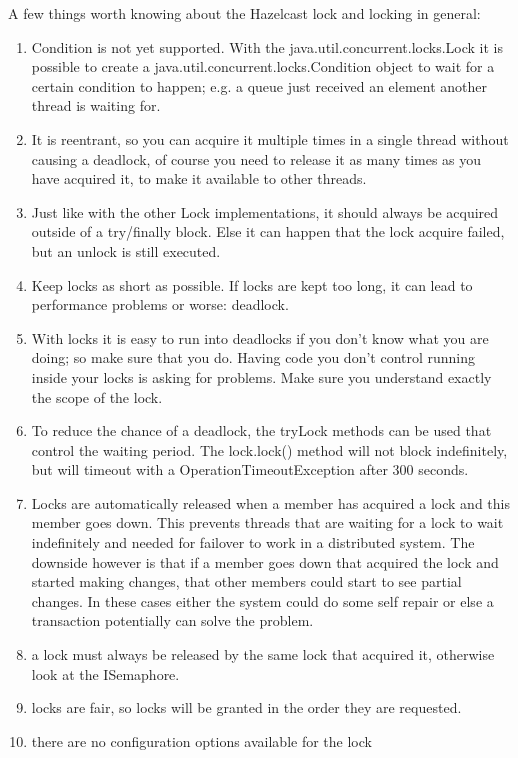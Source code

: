 A few things worth knowing about the Hazelcast lock and locking in general:
\begin{enumerate}
\item Condition is not yet supported. With the java.util.concurrent.locks.Lock it is possible to create a java.util.concurrent.locks.Condition object to wait for a certain condition to happen; e.g. a queue just received an element another thread is waiting for.
\item It is reentrant, so you can acquire it multiple times in a single thread without causing a deadlock, of course you need to release it as many times as you have acquired it, to make it available to other threads.
\item Just like with the other Lock implementations, it should always be acquired outside of a try/finally block. Else it can happen that the lock acquire failed, but an unlock is still executed. 
\item Keep locks as short as possible. If locks are kept too long, it can lead to performance problems or worse: deadlock.
\item With locks it is easy to run into deadlocks if you don't know what you are doing; so make sure that you do. Having code you don't control running inside your locks is asking for problems. Make sure you understand exactly the scope of the lock. 
\item To reduce the chance of a deadlock, the tryLock methods can be used that control the waiting period. The lock.lock() method will not block indefinitely, but will timeout with a OperationTimeoutException after 300 seconds.  
\item Locks are automatically released when a member has acquired a lock and this member goes down. This prevents threads that are waiting for a lock to wait indefinitely and needed for failover to work in a distributed system. The downside however is that if a member goes down that acquired the lock and started making changes, that other members could start to see partial changes. In these cases either the system could do some self repair or else a transaction potentially can solve the problem.
\item a lock must always be released by the same lock that acquired it, otherwise look at the ISemaphore.
\item locks are fair, so locks will be granted in the order they are requested.
\item there are no configuration options available for the lock
\end{enumerate}

